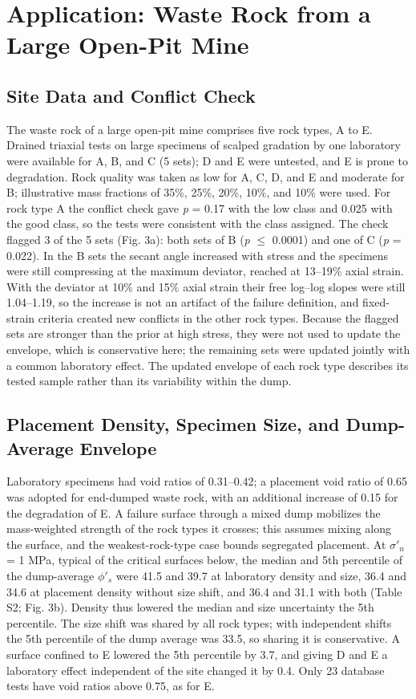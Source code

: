 \documentclass[Journal,letterpaper]{ascelike-new}
\begin{document}
\section{Application: Waste Rock from a Large Open-Pit Mine}
\subsection{Site Data and Conflict Check}
The waste rock of a large open-pit mine comprises five rock types, A to E. Drained triaxial tests on large specimens of scalped gradation by one laboratory were available for A, B, and C (5 sets); D and E were untested, and E is prone to degradation. Rock quality was taken as low for A, C, D, and E and moderate for B; illustrative mass fractions of 35\%, 25\%, 20\%, 10\%, and 10\% were used. For rock type A the conflict check gave \textit{p} = 0.17 with the low class and 0.025 with the good class, so the tests were consistent with the class assigned. The check flagged 3 of the 5 sets (Fig. 3a): both sets of B (\textit{p} $\le$ 0.0001) and one of C (\textit{p} = 0.022). In the B sets the secant angle increased with stress and the specimens were still compressing at the maximum deviator, reached at 13--19\% axial strain. With the deviator at 10\% and 15\% axial strain their free log--log slopes were still 1.04--1.19, so the increase is not an artifact of the failure definition, and fixed-strain criteria created new conflicts in the other rock types. Because the flagged sets are stronger than the prior at high stress, they were not used to update the envelope, which is conservative here; the remaining sets were updated jointly with a common laboratory effect. The updated envelope of each rock type describes its tested sample rather than its variability within the dump.

\subsection{Placement Density, Specimen Size, and Dump-Average Envelope}
Laboratory specimens had void ratios of 0.31--0.42; a placement void ratio of 0.65 was adopted for end-dumped waste rock, with an additional increase of 0.15 for the degradation of E. A failure surface through a mixed dump mobilizes the mass-weighted strength of the rock types it crosses; this assumes mixing along the surface, and the weakest-rock-type case bounds segregated placement. At $\sigma'_n$ = 1 MPa, typical of the critical surfaces below, the median and 5th percentile of the dump-average $\phi'_s$ were 41.5\textdegree{} and 39.7\textdegree{} at laboratory density and size, 36.4\textdegree{} and 34.6\textdegree{} at placement density without size shift, and 36.4\textdegree{} and 31.1\textdegree{} with both (Table S2; Fig. 3b). Density thus lowered the median and size uncertainty the 5th percentile. The size shift was shared by all rock types; with independent shifts the 5th percentile of the dump average was 33.5\textdegree{}, so sharing it is conservative. A surface confined to E lowered the 5th percentile by 3.7\textdegree{}, and giving D and E a laboratory effect independent of the site changed it by 0.4\textdegree{}. Only 23 database tests have void ratios above 0.75, as for E.
\end{document}
